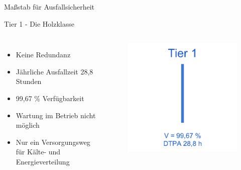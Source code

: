 \documentclass[10pt]{beamer}
\begin{document}
%
%
\begin{frame}[fragile]{Maßstab für Ausfallsicherheit}
\begin{alertblock}{Tier 1 - Die Holzklasse}
\end{alertblock}
		\begin{columns}[T,c,onlytextwidth]
			\begin{itemize}
			\item Keine Redundanz
			\item Jährliche Ausfallzeit 28,8 Stunden
			\item 99,67 \% Verfügbarkeit
			\item Wartung im Betrieb nicht möglich
			\item Nur ein Versorgungsweg für Kälte- und Energieverteilung
		\end{itemize}
	 \begin{figure}
		\includegraphics[width=1\textwidth]{images/tier1}
	\end{figure}
\end{columns}
\end{frame}
\end{document}
